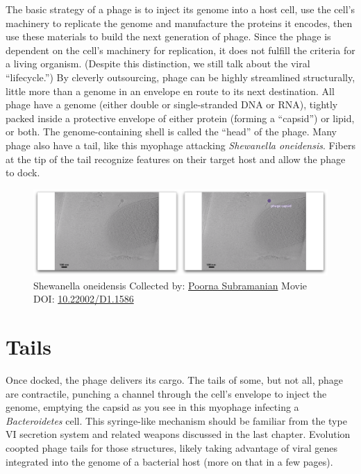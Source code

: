 \documentclass[]{tufte-book}
\begin{document}
The basic strategy of a phage is to inject its genome into a host cell,
use the cell's machinery to replicate the genome and manufacture the
proteins it encodes, then use these materials to build the next
generation of phage. Since the phage is dependent on the cell's
machinery for replication, it does not fulfill the criteria for a living
organism. (Despite this distinction, we still talk about the viral
``lifecycle.'') By cleverly outsourcing, phage can be highly streamlined
structurally, little more than a genome in an envelope en route to its
next destination. All phage have a genome (either double or
single-stranded DNA or RNA), tightly packed inside a protective envelope
of either protein (forming a ``capsid'') or lipid, or both. The
genome-containing shell is called the ``head'' of the phage. Many phage
also have a tail, like this myophage attacking \emph{Shewanella
oneidensis}. Fibers at the tip of the tail recognize features on their
target host and allow the phage to dock.





\begin{figure}
\includegraphics{movie_stills/10_1} \caption[Shewanella oneidensis Collected by:
\protect\hyperlink{poorna_subramanian}{Poorna Subramanian} Movie DOI:
\href{https://doi.org/10.22002/D1.1586}{10.22002/D1.1586}]{Shewanella oneidensis Collected by:
\protect\hyperlink{poorna_subramanian}{Poorna Subramanian} Movie DOI:
\href{https://doi.org/10.22002/D1.1586}{10.22002/D1.1586}}\label{fig:10-1}
\end{figure}

\section{Tails}\label{tails}

Once docked, the phage delivers its cargo. The tails of some, but not
all, phage are contractile, punching a channel through the cell's
envelope to inject the genome, emptying the capsid as you see in this
myophage infecting a \emph{Bacteroidetes} cell. This syringe-like
mechanism should be familiar from the type VI secretion system and
related weapons discussed in the last chapter. Evolution coopted phage
tails for those structures, likely taking advantage of viral genes
integrated into the genome of a bacterial host (more on that in a few
pages).
\end{document}

